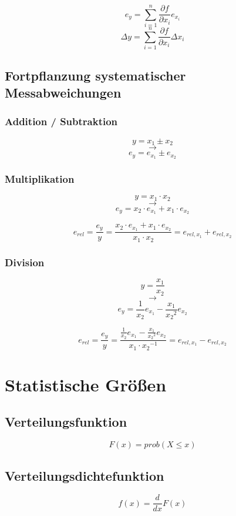 \begin{multicols}{2}
\[ e_y = \sum_{i = 1}^{n} \frac{\partial f}{\partial x_i} e_{x_i}\]
\vfill
\[ \Delta y = \sum_{i = 1}^{n} \frac{\partial f}{\partial x_i}
\Delta{x_i}\]
\vfill
\end{multicols}

\subsection{Fortpflanzung systematischer Messabweichungen}
\subsubsection*{Addition / Subtraktion}
\begin{multicols}{3}
\[y = x_1 \pm x_2\]
\vfill
\[\longrightarrow\]
\vfill
\[e_y = e_{x_1} \pm e_{x_2}\]
\vfill
\end{multicols}

\subsubsection*{Multiplikation}
\begin{multicols}{3}
\[y = x_1 \cdot x_2\]
\vfill
\[\longrightarrow\]
\vfill
\[e_y = x_2 \cdot e_{x_1} + x_1 \cdot
e_{x_2}\]
\end{multicols}

\[ 
e_{rel} = \frac{e_y}{y} = \frac{x_2 \cdot e_{x_1} + x_1 \cdot e_{x_2}}{x_1
\cdot x_2} = e_{rel, x_1} + e_{rel, x_2} 
\]

\subsubsection*{Division}
\begin{multicols}{3}
\[y = \frac{x_1}{x_2}\]
\vfill
\[\longrightarrow\]
\vfill
\[e_y = \frac{1}{x_2}e_{x_1} -
\frac{x_1}{{x_2}^2}e_{x_2}\]
\end{multicols}
\[
e_{rel} = \frac{e_y}{y} = \frac{\frac{1}{x_2}e_{x_1} -
\frac{x_1}{{x_2}^2}e_{x_2}}{x_1 \cdot {x_2}^{-1}} = e_{rel, x_1} - e_{rel, x_2}
\]

\section{Statistische Größen}
\begin{multicols}{2}
	\subsection*{Verteilungsfunktion}
	\[F\left(x\right) = prob\left(X \leq x \right) \]
		\vfill
	\subsection*{Verteilungsdichtefunktion}
	\[f\left(x\right) = \frac{d}{dx}F\left(x\right)\]
		\vfill
\end{multicols}

